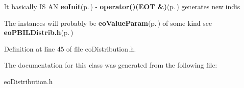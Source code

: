 It basically IS AN {\bf eo\-Init}{\rm (p.\,\pageref{classeo_init})} - {\bf operator()(EOT \&)}{\rm (p.\,\pageref{classeo_distribution_a0})} generates new indis

The instances will probably be {\bf eo\-Value\-Param}{\rm (p.\,\pageref{classeo_value_param})} of some kind see {\bf eo\-PBILDistrib.h}{\rm (p.\,\pageref{eo_p_b_i_l_distrib_8h})} 



Definition at line 45 of file eo\-Distribution.h.

The documentation for this class was generated from the following file:\begin{CompactItemize}
\item 
eo\-Distribution.h\end{CompactItemize}
